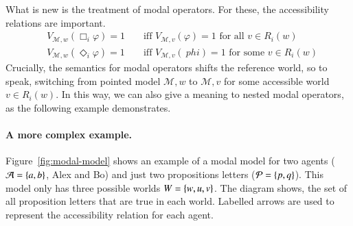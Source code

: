 \documentclass[nobib,nofonts]{tufte-handout}
\renewcommand{\phi}{\ensuremath{\varphi}}
\newcommand{\Model}{\ensuremath{\mathcal{M}}}
\begin{document}
\noindent What is new is the treatment of modal operators.
For these, the accessibility relations are important.
%
\begin{align*}
    & V_{\Model, w}(\Box_i \phi) = 1 & & \text{ \ iff \ } V_{\Model, v}(\phi) = 1 \text{ for all $v \in R_i(w)$} \\
    & V_{\Model, w}(\Diamond_i \phi) = 1 & & \text{ \ iff \ } V_{\Model, v}(\ phi) = 1 \text{ for some $v \in R_i(w)$}
\end{align*}
%
Crucially, the semantics for modal operators shifts the reference world, so to speak, switching from pointed model $\Model, w$ to $\Model, v$ for some accessible world $v \in R_{i}(w)$.
In this way, we can also give a meaning to nested modal operators, as the following example demonstrates.

\paragraph{A more complex example.}
Figure~\ref{fig:modal-model} shows an example of a modal model for two agents ($\mathcal{A} = \left\{a,b\right\}$, Alex and Bo) and just two propositions letters ($\mathcal{P} = \left\{p, q\right\}$).
This model only has three possible worlds $W = \left\{w,u,v\right\}$.
The diagram shows, the set of all proposition letters that are true in each world.
Labelled arrows are used to represent the accessibility relation for each agent.
\end{document}
